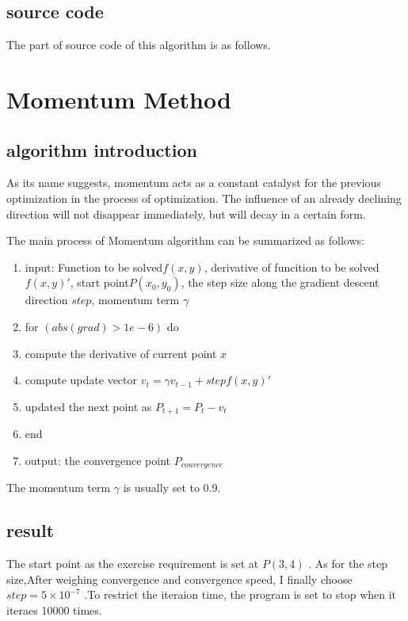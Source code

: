 \documentclass[aps,letterpaper,10pt]{article}
\begin{document}
\subsection{source code}
The part of source code of this algorithm is as follows.  \vspace{5mm}
	
	\vspace{3mm}



\newpage
\section{Momentum Method}
\subsection{algorithm introduction}
As its name suggests, momentum acts as a constant catalyst for the previous optimization in the process of optimization. The influence of an already declining direction will not disappear immediately, but will decay in a certain form.\vspace{3mm}

The main process of Momentum algorithm can be summarized as follows:

\begin{enumerate}
	\item input: Function to be solved$f(x,y)$, derivative of funcition to be solved${f(x,y)}'$, start point$P(x_0,y_0)$, the step size along the gradient descent direction $step$, momentum term $\gamma$
	\item for $(abs(grad)> 1e-6)$ do
	\item compute the derivative of current point $x$
  \item compute update vector $v_t=\gamma v_{t-1} + step{f(x,y)}'$
	\item updated the next point as $P_{t+1}=P_t - v_t$
  \item end
	\item output: the convergence point $P_{convergence}$
\end{enumerate}
The momentum term $\gamma$ is usually set to 0.9.

\subsection{result}
The start point as the exercise requirement is set at $P(3,4)$ . As for the step size,After weighing convergence and convergence speed, I finally choose $step = 5\times10^{-7}$ .To restrict the iteraion time, the program is set to stop when it iteraes 10000 times.
\end{document}
